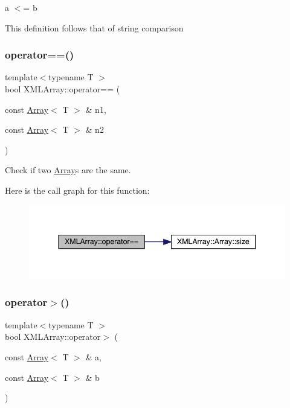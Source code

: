 a $<$= b 

This definition follows that of string comparison \mbox{\label{namespaceXMLArray_a832b56f8c7a9d6415cadd0d6e60635f1}} 
\subsubsection{\texorpdfstring{operator==()}{operator==()}}
{\footnotesize\ttfamily template$<$typename T $>$ \\
bool X\+M\+L\+Array\+::operator== (\begin{DoxyParamCaption}\item[{const \mbox{\hyperlink{classXMLArray_1_1Array}{Array}}$<$ T $>$ \&}]{n1,  }\item[{const \mbox{\hyperlink{classXMLArray_1_1Array}{Array}}$<$ T $>$ \&}]{n2 }\end{DoxyParamCaption})\hspace{0.3cm}{\ttfamily [inline]}}



Check if two \mbox{\hyperlink{classXMLArray_1_1Array}{Array}}\textquotesingle{}s are the same. 

Here is the call graph for this function\+:
\nopagebreak
\begin{figure}[H]
\begin{center}
\leavevmode
\includegraphics[width=344pt]{dd/db1/namespaceXMLArray_a832b56f8c7a9d6415cadd0d6e60635f1_cgraph}
\end{center}
\end{figure}
\mbox{\label{namespaceXMLArray_ad9684cbf7b3089e446a523042d2818c1}} 
\subsubsection{\texorpdfstring{operator$>$()}{operator>()}}
{\footnotesize\ttfamily template$<$typename T $>$ \\
bool X\+M\+L\+Array\+::operator$>$ (\begin{DoxyParamCaption}\item[{const \mbox{\hyperlink{classXMLArray_1_1Array}{Array}}$<$ T $>$ \&}]{a,  }\item[{const \mbox{\hyperlink{classXMLArray_1_1Array}{Array}}$<$ T $>$ \&}]{b }\end{DoxyParamCaption})\hspace{0.3cm}{\ttfamily [inline]}}



